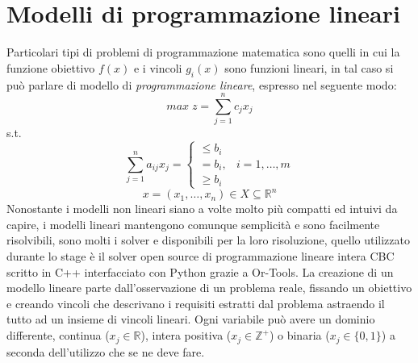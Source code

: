 \section{Modelli di programmazione lineari}
Particolari tipi di problemi di programmazione matematica sono quelli in cui la funzione obiettivo $f(x)$ e i vincoli $g_i(x)$ sono funzioni lineari, in tal caso si può parlare di modello di \textit{programmazione lineare}, espresso nel seguente modo:
$$ max\; z = \sum_{j=1}^n c_j x_j $$
s.t.
$$\sum_{j=1}^n a_{ij} x_j = \begin{cases} \leq b_i \\ = b_i, & i = 1,\dots,m \\ \geq b_i \end{cases}$$
$$x = (x_1,\dots,x_n) \in X \subseteq \mathbb{R}^n$$
Nonostante i modelli non lineari siano a volte molto più compatti ed intuivi da capire, i modelli lineari mantengono comunque semplicità e sono facilmente risolvibili, sono molti i solver  e  disponibili per la loro risoluzione, quello utilizzato durante lo stage è il solver open source di programmazione lineare intera CBC scritto in C++ interfacciato con Python grazie a Or-Tools. La creazione di un modello lineare parte dall'osservazione di un problema reale, fissando un obiettivo e creando vincoli che descrivano i requisiti estratti dal problema astraendo il tutto ad un insieme di vincoli lineari.
Ogni variabile può avere un dominio differente, continua ($x_j \in \mathbb{R}$), intera positiva ($x_j \in \mathbb{Z}^+$) o binaria ($x_j \in \{0,1\}$) a seconda dell'utilizzo che se ne deve fare.

